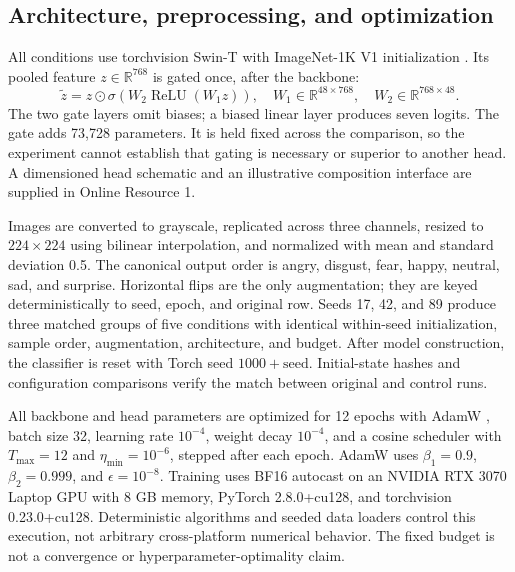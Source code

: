 \documentclass[pdflatex,sn-mathphys-num]{sn-jnl}
\begin{document}
\subsection{Architecture, preprocessing, and optimization}
All conditions use torchvision Swin-T with ImageNet-1K V1 initialization \cite{liu2021swin,deng2009imagenet,paszke2019pytorch}. Its pooled feature $z\in\mathbb{R}^{768}$ is gated once, after the backbone:
\begin{equation}
\tilde z=z\odot\sigma\!\left(W_2\operatorname{ReLU}(W_1z)\right),
\quad W_1\in\mathbb{R}^{48\times768},\quad W_2\in\mathbb{R}^{768\times48}.
\end{equation}
The two gate layers omit biases; a biased linear layer produces seven logits. The gate adds 73,728 parameters. It is held fixed across the comparison, so the experiment cannot establish that gating is necessary or superior to another head.
A dimensioned head schematic and an illustrative composition interface are supplied in Online Resource 1.

Images are converted to grayscale, replicated across three channels, resized to $224\times224$ using bilinear interpolation, and normalized with mean and standard deviation 0.5. The canonical output order is angry, disgust, fear, happy, neutral, sad, and surprise. Horizontal flips are the only augmentation; they are keyed deterministically to seed, epoch, and original row. Seeds 17, 42, and 89 produce three matched groups of five conditions with identical within-seed initialization, sample order, augmentation, architecture, and budget. After model construction, the classifier is reset with Torch seed $1000+\mathrm{seed}$. Initial-state hashes and configuration comparisons verify the match between original and control runs.

All backbone and head parameters are optimized for 12 epochs with AdamW \cite{loshchilov2019adamw}, batch size 32, learning rate $10^{-4}$, weight decay $10^{-4}$, and a cosine scheduler with $T_{\max}=12$ and $\eta_{\min}=10^{-6}$, stepped after each epoch. AdamW uses $\beta_1=0.9$, $\beta_2=0.999$, and $\epsilon=10^{-8}$. Training uses BF16 autocast on an NVIDIA RTX 3070 Laptop GPU with 8 GB memory, PyTorch 2.8.0+cu128, and torchvision 0.23.0+cu128. Deterministic algorithms and seeded data loaders control this execution, not arbitrary cross-platform numerical behavior. The fixed budget is not a convergence or hyperparameter-optimality claim.
\end{document}
